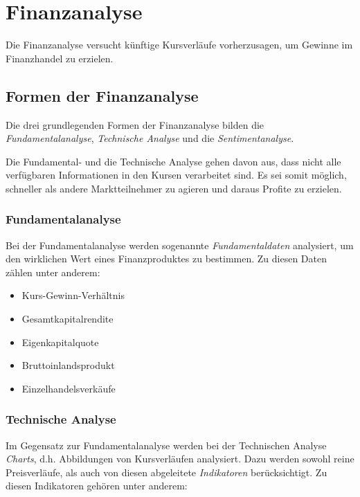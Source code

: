 \section{Finanzanalyse}
\author{Dennis Kempf, Moritz Hollenberg, Patrice Becker}

Die Finanzanalyse versucht künftige Kursverläufe vorherzusagen, um Gewinne im Finanzhandel zu erzielen.

\subsection{Formen der Finanzanalyse}
\author{Dennis Kempf}

Die drei grundlegenden Formen der Finanzanalyse bilden die \emph{Fundamentalanalyse}, \emph{Technische Analyse} und die \emph{Sentimentanalyse}. 

Die Fundamental- und die Technische Analyse gehen davon aus, dass nicht alle verfügbaren Informationen in den Kursen verarbeitet sind. Es sei somit möglich, schneller als andere Marktteilnehmer zu agieren und daraus Profite zu erzielen.

\subsubsection{Fundamentalanalyse}
\author{Dennis Kempf}

Bei der Fundamentalanalyse werden sogenannte \emph{Fundamentaldaten} analysiert, um den wirklichen Wert eines Finanzproduktes zu bestimmen. Zu diesen Daten zählen unter anderem:\\ 

\begin{itemize}
	\item Kurs-Gewinn-Verhältnis
	\item Gesamtkapitalrendite
	\item Eigenkapitalquote
	\item Bruttoinlandsprodukt
	\item Einzelhandelsverkäufe
\end{itemize}

\subsubsection{Technische Analyse}
\author{Dennis Kempf}
\label{sssec:TechnischeAnalyse}

Im Gegensatz zur Fundamentalanalyse werden bei der Technischen Analyse \emph{Charts}, d.h. Abbildungen von Kursverläufen analysiert. Dazu werden sowohl reine Preisverläufe, als auch von diesen abgeleitete \emph{Indikatoren} berücksichtigt. Zu diesen Indikatoren gehören unter anderem:\\

